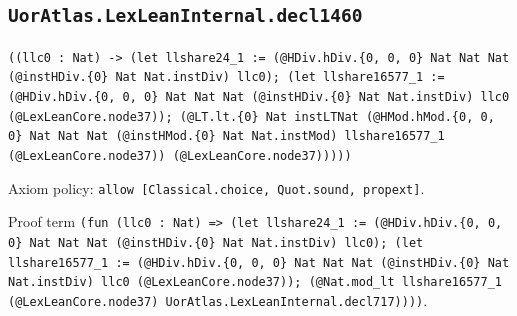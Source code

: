 \documentclass[11pt]{article}
\begin{document}
\subsection*{\texttt{UorAtlas.LexLeanInternal.decl1460}}
\noindent\texttt{((llc0 : Nat) -> (let llshare24\_1 := (@HDiv.hDiv.\{0, 0, 0\} Nat Nat Nat (@instHDiv.\{0\} Nat Nat.instDiv) llc0); (let llshare16577\_1 := (@HDiv.hDiv.\{0, 0, 0\} Nat Nat Nat (@instHDiv.\{0\} Nat Nat.instDiv) llc0 (@LexLeanCore.node37)); (@LT.lt.\{0\} Nat instLTNat (@HMod.hMod.\{0, 0, 0\} Nat Nat Nat (@instHMod.\{0\} Nat Nat.instMod) llshare16577\_1 (@LexLeanCore.node37)) (@LexLeanCore.node37)))))}\par
\noindent Axiom policy: \texttt{allow [Classical.choice, Quot.sound, propext]}.\par
\noindent Proof term \texttt{(fun (llc0 : Nat) => (let llshare24\_1 := (@HDiv.hDiv.\{0, 0, 0\} Nat Nat Nat (@instHDiv.\{0\} Nat Nat.instDiv) llc0); (let llshare16577\_1 := (@HDiv.hDiv.\{0, 0, 0\} Nat Nat Nat (@instHDiv.\{0\} Nat Nat.instDiv) llc0 (@LexLeanCore.node37)); (@Nat.mod\_lt llshare16577\_1 (@LexLeanCore.node37) UorAtlas.LexLeanInternal.decl717))))}.\par
\end{document}
